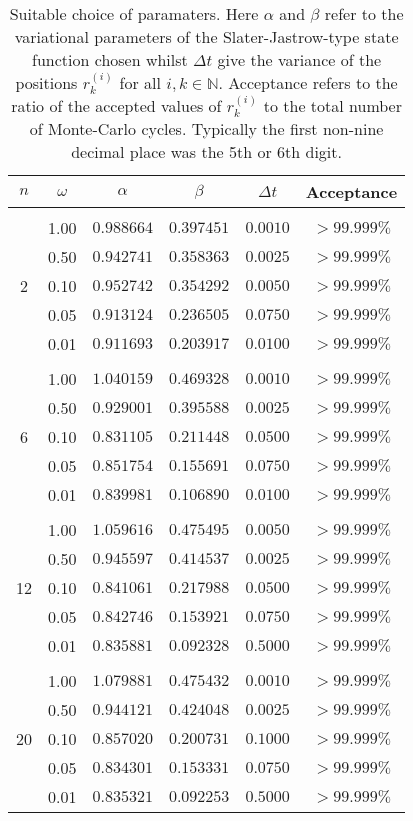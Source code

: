 \documentclass[11pt,english,a4paper]{article}
\begin{document}
\begin{table}
\center
\begin{tabular}{c c c c c c}
$n$ &$\omega$& $\alpha$		& $\beta$		& $\Delta t$	& Acceptance \\
\hline\\
	&1.00 	& $0.988664$	& $0.397451$	& $0.0010$		& $>99.999\%$\\
	&0.50 	& $0.942741$ 	& $0.358363$ 	& $0.0025$		& $>99.999\%$\\
2	&0.10	& $0.952742$ 	& $0.354292$ 	& $0.0050$		& $>99.999\%$\\
	&0.05	& $0.913124$	& $0.236505$ 	& $0.0750$		& $>99.999\%$\\
	&0.01	& $0.911693$	& $0.203917$ 	& $0.0100$		& $>99.999\%$\\
	\\       
	&1.00 	& $1.040159$ 	& $0.469328$ 	& $0.0010$		& $>99.999\%$\\
	&0.50 	& $0.929001$ 	& $0.395588$ 	& $0.0025$		& $>99.999\%$\\
6	&0.10	& $0.831105$ 	& $0.211448$ 	& $0.0500$		& $>99.999\%$\\
	&0.05	& $0.851754$ 	& $0.155691$ 	& $0.0750$		& $>99.999\%$\\
	&0.01	& $0.839981$ 	& $0.106890$ 	& $0.0100$		& $>99.999\%$\\
	\\
	&1.00 	& $1.059616$ 	& $0.475495$ 	& $0.0050$		& $>99.999\%$\\
	&0.50 	& $0.945597$ 	& $0.414537$ 	& $0.0025$		& $>99.999\%$\\
12	&0.10	& $0.841061$ 	& $0.217988$ 	& $0.0500$		& $>99.999\%$\\
	&0.05	& $0.842746$ 	& $0.153921$ 	& $0.0750$		& $>99.999\%$\\
	&0.01	& $0.835881$ 	& $0.092328$ 	& $0.5000$		& $>99.999\%$\\
	\\
	&1.00 	& $1.079881$ 	& $0.475432$ 	& $0.0010$		& $>99.999\%$\\
	&0.50 	& $0.944121$ 	& $0.424048$ 	& $0.0025$		& $>99.999\%$\\
20	&0.10 	& $0.857020$ 	& $0.200731$	& $0.1000$		& $>99.999\%$\\
	&0.05	& $0.834301$	& $0.153331$	& $0.0750$		& $>99.999\%$\\
	&0.01	& $0.835321$ 	& $0.092253$	& $0.5000$		& $>99.999\%$\\
\end{tabular} 
\caption{Suitable choice of paramaters. Here $\alpha$ and $\beta$ refer to the variational parameters of the Slater-Jastrow-type state function chosen whilst $\Delta t$ give the variance of the positions $r^{(i)}_k$ for all $i,k \in \mathbb{N}$. Acceptance refers to the ratio of the accepted values of $r^{(i)}_k$ to the total number of Monte-Carlo cycles. Typically the first non-nine decimal place was the 5th or 6th digit.}\label{tbl:params}
\end{table}
\end{document}
